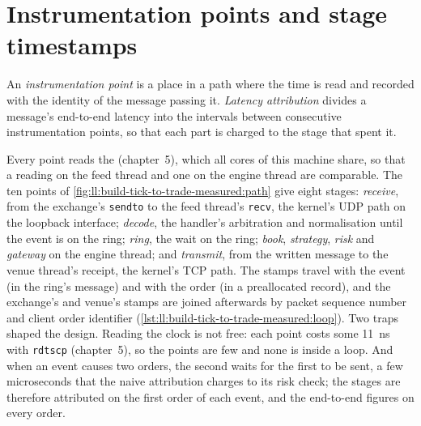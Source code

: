 \label{lst:ll:build-tick-to-trade-measured:path}

\section{Instrumentation points and stage timestamps}

\begin{definition}\label{def:ll:build-tick-to-trade-measured:points}
An \emph{instrumentation point} is a place in a path where the time is read and recorded with the
identity of the message passing it. \emph{Latency attribution} divides a message's end-to-end latency
into the intervals between consecutive instrumentation points, so that each part is charged to the stage that spent it.
\end{definition}

Every point reads the  (chapter~5), which all cores of this machine share, so that a reading on the feed
thread and one on the engine thread are comparable. The ten points of \cref{fig:ll:build-tick-to-trade-measured:path} give eight
stages: \emph{receive}, from the exchange's \texttt{sendto} to the feed thread's \texttt{recv}, the kernel's UDP path on the
loopback interface; \emph{decode}, the handler's arbitration and normalisation until the event is on the ring; \emph{ring},
the wait on the ring; \emph{book}, \emph{strategy}, \emph{risk} and \emph{gateway} on the engine thread; and \emph{transmit},
from the written message to the venue thread's receipt, the kernel's TCP path. The stamps travel with the event (in the ring's
message) and with the order (in a preallocated record), and the exchange's and venue's stamps are joined afterwards by packet
sequence number and client order identifier (\cref{lst:ll:build-tick-to-trade-measured:loop}). Two traps shaped the design.
Reading the clock is not free: each point costs some \qty{11}{\nano\second} with \texttt{rdtscp} (chapter~5), so the points
are few and none is inside a loop. And
when an event causes two orders, the second waits for the first to be sent, a few microseconds that the naive attribution
charges to its risk check; the stages are therefore attributed on the first order of each event, and the end-to-end figures on
every order.

